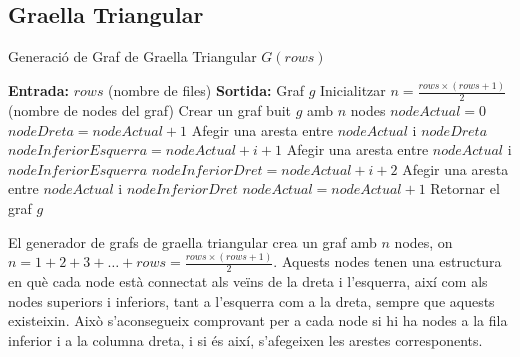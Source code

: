 \documentclass[a4paper]{article}
\begin{document}
	\subsection{Graella Triangular}

	\begin{algorithm} [H]
		\caption{Generació de Graf de Graella Triangular $G(rows)$}
		\begin{algorithmic} [1]
			\Statex \textbf{Entrada:} $rows$ (nombre de files)
			\Statex \textbf{Sortida:} Graf $g$
			\Statex \vspace{-0.25em}
			\State Inicialitzar $n = \frac{rows \times (rows + 1)}{2}$ (nombre de nodes del graf)
			\State Crear un graf buit $g$ amb $n$ nodes
			\State $nodeActual = 0$
						\State $nodeDreta = nodeActual + 1$
						\State Afegir una aresta entre $nodeActual$ i $nodeDreta$
					\EndIf
						\State $nodeInferiorEsquerra = nodeActual + i + 1$
						\State Afegir una aresta entre $nodeActual$ i $nodeInferiorEsquerra$
						\State $nodeInferiorDret = nodeActual + i + 2$
						\State Afegir una aresta entre $nodeActual$ i $nodeInferiorDret$
					\EndIf
					\State $nodeActual = nodeActual + 1$
				\EndFor
			\EndFor
			\State Retornar el graf $g$
		\end{algorithmic}
	\end{algorithm}
	
	El generador de grafs de graella triangular crea un graf amb \( n \) nodes, on \( n = 1 + 2 + 3 + \ldots + rows = \frac{rows \times (rows + 1)}{2} \). Aquests nodes tenen una estructura en què cada node està connectat als veïns de la dreta i l'esquerra, així com als nodes superiors i inferiors, tant a l'esquerra com a la dreta, sempre que aquests existeixin. Això s'aconsegueix comprovant per a cada node si hi ha nodes a la fila inferior i a la columna dreta, i si és així, s'afegeixen les arestes corresponents. \\
\end{document}
